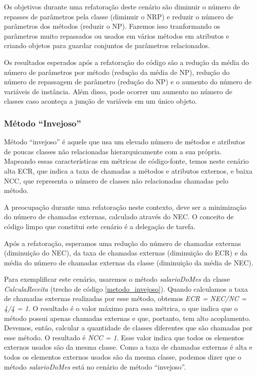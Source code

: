                                      
	
Os objetivos durante uma refatoração deste cenário são diminuir o número de repasses de parâmetros pela classe (diminuir o NRP) e reduzir o número de parâmetros dos métodos (reduzir o NP). Fazemos isso tranformando os parâmetros muito repassados ou usados em vários métodos em atributos e criando objetos para guardar conjuntos de parâmetros relacionados.
	
Os resultados esperados após a refatoração do código são a redução da média do número de parâmetros por método (redução da média de NP), redução do número de repassagem de parâmetro (redução do NP) e o aumento do número de variáveis de instância. Além disso, pode ocorrer um aumento no número de classes caso aconteça a junção de variáveis em um único objeto.	           


\subsubsection{Método ``Invejoso''}
	
Método ``invejoso'' é aquele que usa um elevado número de métodos e atributos de poucas classes não relacionadas hierarquicamente com a sua própria. Mapeando essas características em métricas de código-fonte, temos neste cenário alta ECR, que indica a taxa de chamadas a métodos e atributos externos, e baixa NCC, que representa o número de classes não relacionadas chamadas pelo método.
	
A preocupação durante uma refatoração neste contexto, deve ser a minimização do número de chamadas externas, calculado através do NEC. O conceito de código limpo que constitui este cenário é a delegação de tarefa.
	
Após a refatoração, esperamos uma redução do número de chamadas externas (diminuição do NEC), da taxa de chamadas externas (diminuição do ECR) e da média do número de chamadas externas da classe (diminuição da média de NEC).
                      
Para exemplificar este cenário, usaremos o método \textit{salarioDoMes} da classe \textit{CalculaReceita} (trecho de código \ref{metodo_invejoso}). Quando calculamos a taxa de chamadas externas realizadas por esse método, obtemos \textit{ECR = NEC/NC = 4/4 = 1}. O resultado é o valor máximo para essa métrica, o que indica que o método possui apenas chamadas externas e que, portanto, tem alto acoplamento. Devemos, então, calcular a quantidade de classes diferentes que são chamadas por esse método. O resultado é \textit{NCC = 1}. Esse valor indica que todos os elementos externos usados são da mesma classe. Como a taxa de chamadas externas é alta e todos os elementos externos usados são da mesma classe, podemos dizer que o método \textit{salarioDoMes} está no cenário de método ``invejoso''.


